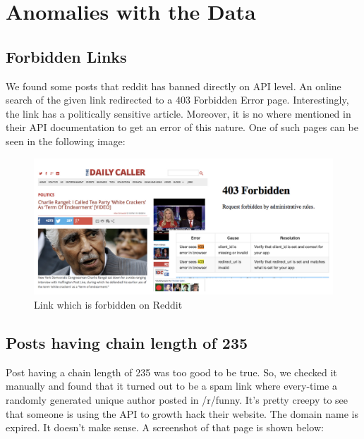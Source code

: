 \documentclass{article} %
\begin{document}
\newpage


\section{Anomalies with the Data}

\subsection{Forbidden Links}

We found some posts that reddit has banned directly on API level. An online search of the given link redirected to a 403 Forbidden Error page. Interestingly, the link has a politically sensitive article. Moreover, it is no where mentioned in their API documentation to get an error of this nature. One of such pages can be seen in the following image:

\begin{figure}[h]
\begin{center}
\includegraphics[width=4.6in]{pol.png}
\caption{Link which is forbidden on Reddit}
\end{center}
\end{figure}

\subsection{Posts having chain length of 235}

Post having a chain length of 235 was too good to be true. So, we checked it manually and found that it turned out to be a spam link where every-time a randomly generated unique author posted in /r/funny. It's pretty creepy to see that someone is using the API to growth hack their website.  The domain name is expired. It doesn't make sense. A screenshot of that page is shown below:
\end{document}
